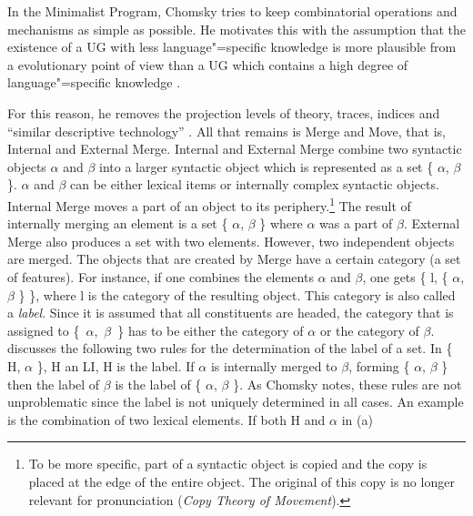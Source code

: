 In the Minimalist Program, Chomsky tries to keep combinatorial operations and mechanisms as simple as possible. He motivates this with
the assumption that the existence of a UG with less language"=specific knowledge is more plausible from a evolutionary point of view than a UG
which contains a high degree of language"=specific knowledge \citep[]{Chomsky2008a}.

For this reason, he removes the projection levels of \xbar theory, traces,
indices and ``similar descriptive technology'' \citep[]{Chomsky2008a}. All that remains is Merge and Move, that is, Internal and External Merge. Internal and External Merge combine two syntactic objects $\alpha$ and $\beta$ into a larger
syntactic object which is represented as a set \{ $\alpha$, $\beta$ \}.  $\alpha$ and $\beta$ can be
either lexical items or internally complex syntactic objects. Internal Merge moves a part of an object to its periphery.\footnote{%
To be more specific, part of a syntactic object is copied and the copy is placed at the edge of the entire object. The original of this copy is
no longer relevant for pronunciation (\emph{Copy Theory of Move\-ment}).
} The result of internally merging
an element is a set \{ $\alpha$, $\beta$ \} where $\alpha$ was a part of $\beta$. External Merge
also produces a set with two elements. However, two independent objects are merged. The objects that are created
by Merge have a certain category (a set of features). For instance, if one combines the elements $\alpha$ and $\beta$, one
gets \{ l, \{ $\alpha$, $\beta$ \} \}, where l is the category of the resulting object. This category
is also called a \emph{label}. Since it is assumed that all constituents are headed, the category that is
assigned to \{~$\alpha$,~$\beta$~\} has to be either the category of $\alpha$ or the category of
$\beta$. 
\citet[]{Chomsky2008a} discusses the following two rules for the determination of the label of a set.
\eal
\label{Label-Berechnung}
\ex\label{Label1} In \{ H, $\alpha$ \}, H an LI, H is the label.
\ex\label{Label2} If $\alpha$ is internally merged to $\beta$, forming \{ $\alpha$, $\beta$ \} then
the label of $\beta$ is the label of \{ $\alpha$, $\beta$ \}.
\zl
As Chomsky notes, these rules are not unproblematic since the label is not uniquely determined in all
cases. An example is the combination of two lexical elements. If both H and $\alpha$ in (a)
